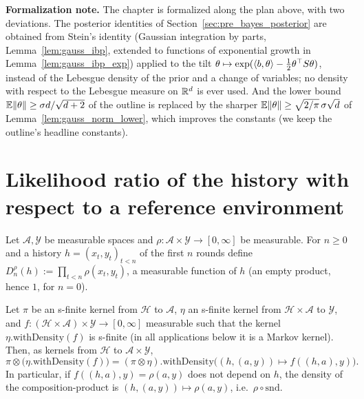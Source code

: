 \textbf{Formalization note.} The chapter is formalized along the plan above, with two
deviations. The posterior identities of Section~\ref{sec:pre_bayes_posterior} are obtained
from Stein's identity (Gaussian integration by parts, Lemma~\ref{lem:gauss_ibp}, extended to
functions of exponential growth in Lemma~\ref{lem:gauss_ibp_exp}) applied to the tilt
$\theta \mapsto \exp(\langle b, \theta \rangle - \tfrac12\theta^\top S\theta)$, instead of the Lebesgue
density of the prior and a change of variables; no density with respect to the Lebesgue
measure on $\mathbb{R}^d$ is ever used. And the lower bound $\mathbb{E}\lVert \theta \rVert \ge \sigma d/\sqrt{d+2}$ of
the outline is replaced by the sharper $\mathbb{E}\lVert \theta \rVert \ge \sqrt{2/\pi}\,\sigma\sqrt d$ of
Lemma~\ref{lem:gauss_norm_lower}, which improves the constants (we keep the outline's
headline constants).

\section{Likelihood ratio of the history with respect to a reference environment}
\label{sec:pre_bayes_lr}

\begin{definition}\label{def:pb_env_density}
\leanok
Let $\mathcal{A},\mathcal{Y}$ be measurable spaces and $\rho : \mathcal{A}\times\mathcal{Y}\to[0,\infty]$
be measurable. For $n\ge0$ and a history $h = (x_t,y_t)_{t< n}$ of the first $n$ rounds define
$D_n^\rho(h) := \prod_{t<n}\rho(x_t,y_t)$, a measurable function of $h$ (an empty product,
hence $1$, for $n = 0$).
\end{definition}

\begin{lemma}
\label{lem:pb_kernel_compProd_withDensity_right}
\leanok
Let $\pi$ be an s-finite kernel from $\mathcal{H}$ to $\mathcal{A}$, $\eta$ an s-finite kernel
from $\mathcal{H}\times\mathcal{A}$ to $\mathcal{Y}$, and
$f : (\mathcal{H}\times\mathcal{A})\times\mathcal{Y}\to[0,\infty]$ measurable such that the
kernel $\eta.\mathrm{withDensity}(f)$ is s-finite (in all applications below it is a Markov
kernel). Then, as kernels from $\mathcal{H}$ to $\mathcal{A}\times\mathcal{Y}$,
\[
  \pi\otimes\big(\eta.\mathrm{withDensity}(f)\big)
  = (\pi\otimes\eta).\mathrm{withDensity}\big((h,(a,y))\mapsto f((h,a),y)\big).
\]
In particular, if $f((h,a),y) = \rho(a,y)$ does not depend on $h$, the density of the
composition-product is $(h,(a,y))\mapsto\rho(a,y)$, i.e.\ $\rho\circ\mathrm{snd}$.
\end{lemma}

